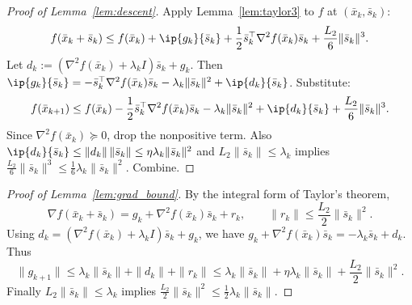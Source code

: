 \documentclass[review,onefignum,onetabnum]{siamart171218}
\begin{document}
	\begin{proof}[Proof of Lemma~\ref{lem:descent}]
		Apply Lemma~\ref{lem:taylor3} to $f$ at $(\bar x_k,\bar s_k)$:
		\[
		f(\bar x_k+\bar s_k)\le f(\bar x_k)+\ip{g_k}{\bar s_k}+\frac12\bar s_k^\top\nabla^2 f(\bar x_k)\bar s_k+\frac{L_2}{6}\|\bar s_k\|^3.
		\]
		Let $d_k:=(\nabla^2 f(\bar x_k)+\lambda_k I)\bar s_k+g_k$.
		Then $\ip{g_k}{\bar s_k}=-\bar s_k^\top\nabla^2 f(\bar x_k)\bar s_k-\lambda_k\|\bar s_k\|^2+\ip{d_k}{\bar s_k}$.
		Substitute:
		\[
		f(\bar x_{k+1})\le f(\bar x_k)-\frac12\bar s_k^\top\nabla^2 f(\bar x_k)\bar s_k-\lambda_k\|\bar s_k\|^2+\ip{d_k}{\bar s_k}+\frac{L_2}{6}\|\bar s_k\|^3.
		\]
		Since $\nabla^2 f(\bar x_k)\succeq 0$, drop the nonpositive term. Also
		$\ip{d_k}{\bar s_k}\le \|d_k\|\,\|\bar s_k\|\le \eta\lambda_k\|\bar s_k\|^2$
		and $L_2\|\bar s_k\|\le \lambda_k$ implies $\frac{L_2}{6}\|\bar s_k\|^3\le \frac16\lambda_k\|\bar s_k\|^2$.
		Combine.
	\end{proof}
	
	\begin{proof}[Proof of Lemma~\ref{lem:grad_bound}]
		By the integral form of Taylor's theorem,
		\[
		\nabla f(\bar x_k+\bar s_k)=g_k+\nabla^2 f(\bar x_k)\bar s_k+r_k,
		\qquad \|r_k\|\le \frac{L_2}{2}\|\bar s_k\|^2.
		\]
		Using $d_k=(\nabla^2 f(\bar x_k)+\lambda_k I)\bar s_k+g_k$, we have
		$g_k+\nabla^2 f(\bar x_k)\bar s_k=-\lambda_k\bar s_k+d_k$.
		Thus
		\[
		\|g_{k+1}\|\le \lambda_k\|\bar s_k\|+\|d_k\|+\|r_k\|
		\le \lambda_k\|\bar s_k\|+\eta\lambda_k\|\bar s_k\|+\frac{L_2}{2}\|\bar s_k\|^2.
		\]
		Finally $L_2\|\bar s_k\|\le \lambda_k$ implies $\frac{L_2}{2}\|\bar s_k\|^2\le \frac12\lambda_k\|\bar s_k\|$.
	\end{proof}
	
\end{document}
